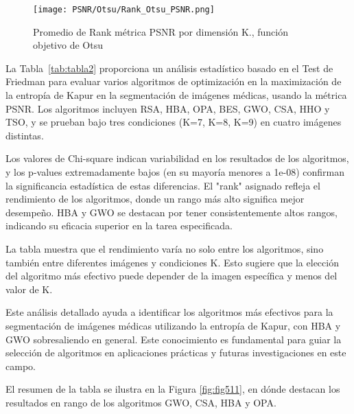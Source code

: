 \documentclass[conference]{IEEEtran}
\begin{document}
\begin{figure}[htbp]
	\centering
	\texttt{[image: PSNR/Otsu/Rank\_Otsu\_PSNR.png]}
		\caption{Promedio de Rank métrica PSNR por dimensión K., función objetivo de Otsu}
\end{figure}



\noindent La Tabla~\ref{tab:tabla2} proporciona un análisis estadístico basado en el Test de Friedman para evaluar varios algoritmos de optimización en la maximización de la entropía de Kapur en la segmentación de imágenes médicas, usando la métrica PSNR. Los algoritmos incluyen RSA, HBA, OPA, BES, GWO, CSA, HHO y TSO, y se prueban bajo tres condiciones (K=7, K=8, K=9) en cuatro imágenes distintas.

\noindent Los valores de Chi-square indican variabilidad en los resultados de los algoritmos, y los p-values extremadamente bajos (en su mayoría menores a 1e-08) confirman la significancia estadística de estas diferencias. El "rank" asignado refleja el rendimiento de los algoritmos, donde un rango más alto significa mejor desempeño. HBA y GWO se destacan por tener consistentemente altos rangos, indicando su eficacia superior en la tarea especificada.

\noindent La tabla muestra que el rendimiento varía no solo entre los algoritmos, sino también entre diferentes imágenes y condiciones K. Esto sugiere que la elección del algoritmo más efectivo puede depender de la imagen específica y menos del valor de K.

\noindent Este análisis detallado ayuda a identificar los algoritmos más efectivos para la segmentación de imágenes médicas utilizando la entropía de Kapur, con HBA y GWO sobresaliendo en general. Este conocimiento es fundamental para guiar la selección de algoritmos en aplicaciones prácticas y futuras investigaciones en este campo.

\noindent El resumen de la tabla se ilustra en la Figura \ref{fig:fig511}, en dónde destacan los resultados en rango de los algoritmos GWO, CSA, HBA y OPA.
\end{document}
